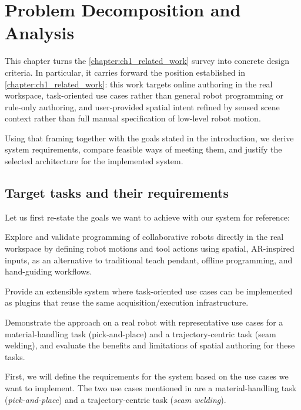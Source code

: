 \chapter{Problem Decomposition and Analysis} \label{chapter:ch2_analysis}

This chapter turns the \autoref{chapter:ch1_related_work} survey into concrete design criteria. In particular, it carries forward the position established in \autoref{chapter:ch1_related_work}: this work targets online authoring in the real workspace, task-oriented use cases rather than general robot programming or rule-only authoring, and user-provided spatial intent refined by sensed scene context rather than full manual specification of low-level robot motion.

Using that framing together with the goals stated in the introduction, we derive system requirements, compare feasible ways of meeting them, and justify the selected architecture for the implemented system.

\section{Target tasks and their requirements} \label{sec:ch2_analysis_tasks_and_requirements}

Let us first re-state the goals we want to achieve with our system for reference:
\begin{goals}
  \item \label{an_goal:1} Explore and validate programming of collaborative robots directly in the real workspace by defining robot motions and tool actions using spatial, AR-inspired inputs, as an alternative to traditional teach pendant, offline programming, and hand-guiding workflows.
  \item \label{an_goal:2} Provide an extensible system where task-oriented use cases can be implemented as plugins that reuse the same acquisition/execution infrastructure.
  \item \label{an_goal:3} Demonstrate the approach on a real robot with representative use cases for a material-handling task (pick-and-place) and a trajectory-centric task (seam welding), and evaluate the benefits and limitations of spatial authoring for these tasks.
\end{goals}

First, we will define the requirements for the system based on the use cases we want to implement. The two use cases mentioned in  are a material-handling task (\emph{pick-and-place}) and a trajectory-centric task (\emph{seam welding}). 

